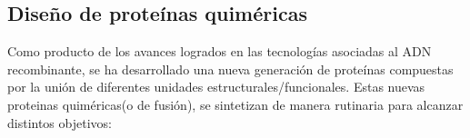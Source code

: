 \subsection{Diseño de proteínas quiméricas}


Como producto de los avances logrados en las tecnologías asociadas al ADN recombinante, se ha desarrollado una nueva generación de proteínas compuestas por la unión de diferentes unidades estructurales/funcionales.
Estas nuevas proteinas quiméricas(o de fusión), se sintetizan de manera rutinaria para alcanzar distintos objetivos:

